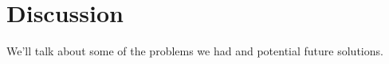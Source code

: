 \section{Discussion}
\label{sec:discuss}

We'll talk about some of the problems we had and potential future solutions.

